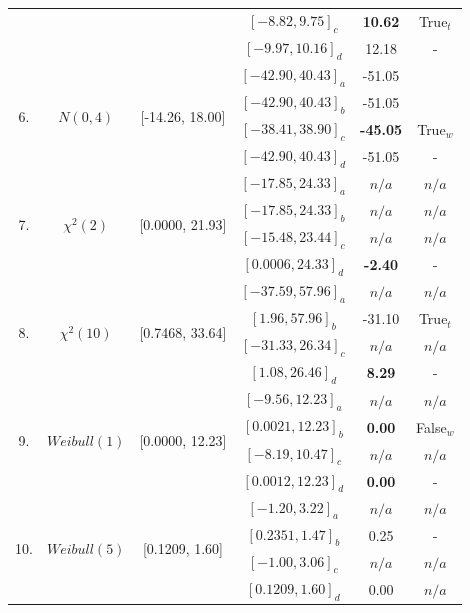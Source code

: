 \documentclass[a4paper,fleqn]{cas-dc}
\begin{document}
\begin{table}[h!]
\begin{threeparttable}
\begin{tabular}{|c|c|c|c|c|c|}
    &&&$[-8.82, 9.75]_c$ & \bf{10.62}     &True$_t$  \\
    &&&$[-9.97, 10.16]_d$ & 12.18 & - \\    
\hline
\multirow{4}{*}{6.} & \multirow{4}{*}{$N(0 ,4)$}&\multirow{4}{*}{[-14.26, 18.00]} & $[-42.90, 40.43]_a$& 
    -51.05 & \\
    &&&$[-42.90, 40.43]_b$ & -51.05 & \\
    &&&$[-38.41, 38.90]_c$ & \bf{-45.05}      &True$_w$\\
    &&&$[-42.90, 40.43]_d$ & -51.05 & - \\
\hline
\multirow{4}{*}{7.} & \multirow{4}{*}{$\chi^2(2)$}&\multirow{4}{*}{[0.0000, 21.93]} & $[-17.85, 24.33]_a$& 
    $n/a$ & $n/a$\\
    &&&$[-17.85, 24.33]_b$ & $n/a$ & $n/a$\\
    &&&$[-15.48, 23.44]_c$ & $n/a$  & $n/a$\\
    &&&$[0.0006, 24.33]_d$ & \bf{-2.40} & - \\                
\hline
\multirow{4}{*}{8.} & \multirow{4}{*}{$\chi^2(10)$}&\multirow{4}{*}{[0.7468, 33.64]} & $[-37.59, 57.96]_a$& 
    $n/a$ & $n/a$\\
    &&&$[1.96, 57.96]_b$ & -31.10 &True$_t$\\
    &&&$[-31.33, 26.34]_c$ & $n/a$      &$n/a$\\
    &&&$[1.08, 26.46]_d$ & \bf{8.29} & - \\
\hline
\multirow{4}{*}{9.} & \multirow{4}{*}{$Weibull(1)$}&\multirow{4}{*}{[0.0000, 12.23]} & $[-9.56, 12.23]_a$& 
    $n/a$ & $n/a$\\
    &&&$[0.0021, 12.23]_b$ & \bf{0.00} &False$_w$\\
    &&&$[-8.19, 10.47]_c$ & $n/a$      &$n/a$\\
    &&&$[0.0012, 12.23]_d$ & \bf{0.00} &- \\
\hline
\multirow{4}{*}{10.} & \multirow{4}{*}{$Weibull(5)$}&\multirow{4}{*}{[0.1209, 1.60]} & $[-1.20, 3.22]_a$& 
    $n/a$ & $n/a$\\
    &&&$[0.2351, 1.47]_b$ & 0.25 & -\\
    &&&$[-1.00, 3.06]_c$ & $n/a$      &$n/a$\\
    &&&$[0.1209, 1.60]_d$ & $0.00$ & $n/a$ \\    
  

\end{tabular}
\end{threeparttable}
\end{table}
\end{document}
